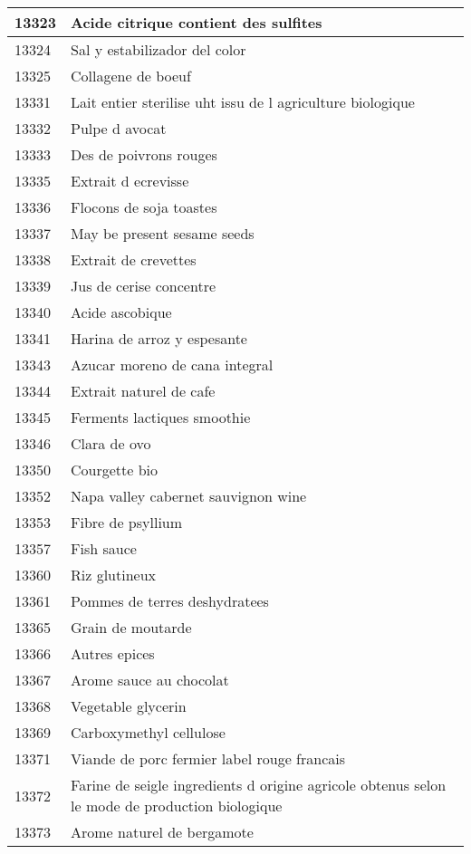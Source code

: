 \begin{longtable}{|l|l|}
13323 & Acide citrique contient des sulfites \\ \hline 
13324 & Sal y estabilizador del color \\ \hline 
13325 & Collagene de boeuf \\ \hline 
13331 & Lait entier sterilise uht issu de l agriculture biologique \\ \hline 
13332 & Pulpe d avocat \\ \hline 
13333 & Des de poivrons rouges \\ \hline 
13335 & Extrait d ecrevisse \\ \hline 
13336 & Flocons de soja toastes \\ \hline 
13337 & May be present sesame seeds \\ \hline 
13338 & Extrait de crevettes \\ \hline 
13339 & Jus de cerise concentre \\ \hline 
13340 & Acide ascobique \\ \hline 
13341 & Harina de arroz y espesante \\ \hline 
13343 & Azucar moreno de cana integral \\ \hline 
13344 & Extrait naturel de cafe \\ \hline 
13345 & Ferments lactiques smoothie \\ \hline 
13346 & Clara de ovo \\ \hline 
13350 & Courgette bio \\ \hline 
13352 & Napa valley cabernet sauvignon wine \\ \hline 
13353 & Fibre de psyllium \\ \hline 
13357 & Fish sauce \\ \hline 
13360 & Riz glutineux \\ \hline 
13361 & Pommes de terres deshydratees \\ \hline 
13365 & Grain de moutarde \\ \hline 
13366 & Autres epices \\ \hline 
13367 & Arome sauce au chocolat \\ \hline 
13368 & Vegetable glycerin \\ \hline 
13369 & Carboxymethyl cellulose \\ \hline 
13371 & Viande de porc fermier label rouge francais \\ \hline 
13372 & Farine de seigle  ingredients d origine agricole obtenus selon le mode de production biologique \\ \hline 
13373 & Arome naturel de bergamote \\ \hline 

\end{longtable}
